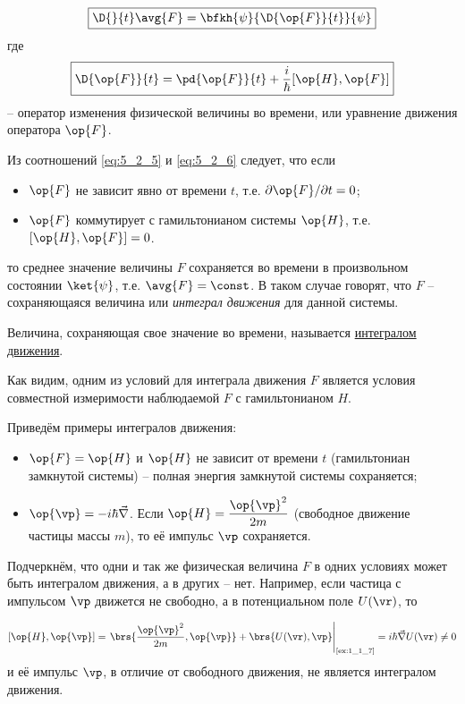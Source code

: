 \begin{equation}
\label{eq:5_2_5}
  \boxed{
    \D{}{t} \avg{F} = \bfkh{\psi}{\D{\op{F}}{t}}{\psi}
  }
\end{equation}%
%
где
\begin{equation}
\label{eq:5_2_6}
\boxed{\D{\op{F}}{t} = \pd{\op{F}}{t} + \frac{i}{\hbar} [\op{H}, \op{F}]}
\end{equation}
-- оператор изменения физической величины во времени, или уравнение движения оператора $\op{F}$.

Из соотношений \eqref{eq:5_2_5} и \eqref{eq:5_2_6} следует, что если
\begin{itemize}
\item $\op{F}$ не зависит явно от времени $t$, т.е. $\partial\op{F}/\partial{t} = 0$;
\item $\op{F}$ коммутирует с гамильтонианом системы $\op{H}$, т.е. $[\op{H}, \op{F}]=0$.
\end{itemize}%
%
то среднее значение величины $F$ сохраняется во времени в произвольном состоянии $\ket{\psi}$, т.е. $\avg{F} = \const$. В таком случае говорят, что $F$ -- сохраняющаяся величина или {\em интеграл движения} для данной системы.

\begin{defn}
Величина, сохраняющая свое значение во времени, называется \underline{интегралом движения}.
\end{defn}%
%
Как видим, одним из условий для интеграла движения $F$ является условия совместной измеримости наблюдаемой $F$ с гамильтонианом $H$.

Приведём примеры интегралов движения:

\begin{itemize}
\item $\op{F} = \op{H}$ и $\op{H}$ не зависит от времени $t$ (гамильтониан замкнутой системы) -- полная энергия замкнутой системы сохраняется;
\item $\op{\vp} = - i \hbar \vec{\nabla}$.  Если $\displaystyle\op{H} = \frac{\op{\vp}^2}{2m}$ (свободное движение частицы массы $m$), то её импульс $\vp$ сохраняется.
\end{itemize}%
%
Подчеркнём, что одни и так же физическая величина $F$ в одних условиях может быть интегралом движения, а в других -- нет. Например, если частица с импульсом $\vp$ движется не свободно, а в потенциальном поле $U(\vr)$, то

\begin{equation}
\label{eq:5_2_7}
  [\op{H}, \op{\vp}] =
  \left.
    \brs{\frac{\op{\vp}^2}{2m}, \op{\vp}} + \brs{U(\vr), \vp}
  \right|_{\text{\cref{ex:1_1_7}}} =
  i \hbar \vec{\nabla} U(\vr) \ne 0
\end{equation}%
%
и её импульс $\vp$, в отличие от свободного движения, не является интегралом движения.

